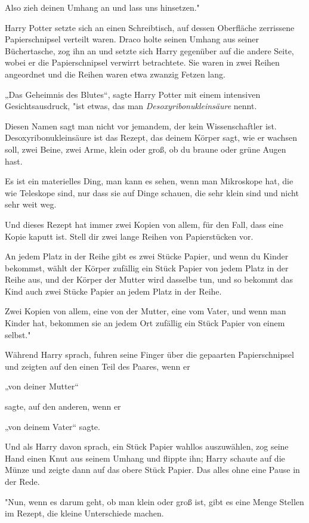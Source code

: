 {Also zieh deinen Umhang an und lass uns hinsetzen."

Harry Potter setzte sich an einen Schreibtisch, auf dessen Oberfläche zerrissene Papierschnipsel verteilt waren. Draco holte seinen Umhang aus seiner Büchertasche, zog ihn an und setzte sich Harry gegenüber auf die andere Seite, wobei er die Papierschnipsel verwirrt betrachtete. Sie waren in zwei Reihen angeordnet und die Reihen waren etwa zwanzig Fetzen lang.

„Das Geheimnis des Blutes“, sagte Harry Potter mit einem intensiven Gesichtsausdruck, "ist etwas, das man \emph{Desoxyribonukleinsäure} nennt.

Diesen Namen sagt man nicht vor jemandem, der kein Wissenschaftler ist. Desoxyribonukleinsäure ist das Rezept, das deinem Körper sagt, wie er wachsen soll, zwei Beine, zwei Arme, klein oder groß, ob du braune oder grüne Augen hast.

Es ist ein materielles Ding, man kann es sehen, wenn man Mikroskope hat, die wie Teleskope sind, nur dass sie auf Dinge schauen, die sehr klein sind und nicht sehr weit weg.

Und dieses Rezept hat immer zwei Kopien von allem, für den Fall, dass eine Kopie kaputt ist. Stell dir zwei lange Reihen von Papierstücken vor.

An jedem Platz in der Reihe gibt es zwei Stücke Papier, und wenn du Kinder bekommst, wählt der Körper zufällig ein Stück Papier von jedem Platz in der Reihe aus, und der Körper der Mutter wird dasselbe tun, und so bekommt das Kind auch zwei Stücke Papier an jedem Platz in der Reihe.

Zwei Kopien von allem, eine von der Mutter, eine vom Vater, und wenn man Kinder hat, bekommen sie an jedem Ort zufällig ein Stück Papier von einem selbst."

Während Harry sprach, fuhren seine Finger über die gepaarten Papierschnipsel und zeigten auf den einen Teil des Paares, wenn er

„von deiner Mutter“

sagte, auf den anderen, wenn er

„von deinem Vater“ sagte.

Und als Harry davon sprach, ein Stück Papier wahllos auszuwählen, zog seine Hand einen Knut aus seinem Umhang und flippte ihn; Harry schaute auf die Münze und zeigte dann auf das obere Stück Papier. Das alles ohne eine Pause in der Rede.

"Nun, wenn es darum geht, ob man klein oder groß ist, gibt es eine Menge Stellen im Rezept, die kleine Unterschiede machen.

}
